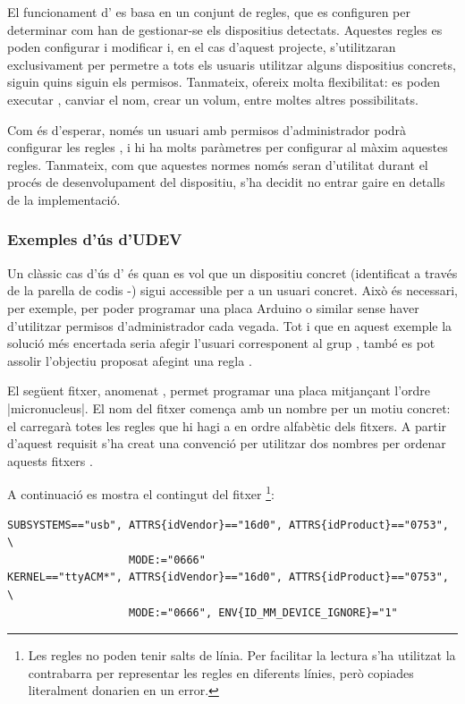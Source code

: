 El funcionament d' es basa en un conjunt de regles,
que es configuren per
determinar com han de gestionar-se els dispositius detectats.
Aquestes regles es poden configurar i modificar i, en el cas d'aquest projecte,
s'utilitzaran exclusivament per permetre a tots els usuaris utilitzar alguns
dispositius concrets, siguin quins siguin els permisos. Tanmateix, 
ofereix molta flexibilitat: es poden executar , canviar el nom,
crear un volum, entre moltes altres possibilitats.

Com és d'esperar, només un usuari amb permisos d'administrador podrà configurar
les regles , i hi ha molts paràmetres per configurar al màxim
aquestes regles. Tanmateix, com que aquestes normes només seran d'utilitat durant
el procés de desenvolupament del dispositiu, s'ha decidit no entrar gaire en
detalls de la implementació.

\subsubsection*{Exemples d'ús d'UDEV}

Un clàssic cas d'ús d' és quan es vol que un dispositiu 
concret (identificat a través de la parella de codis -)
sigui accessible per a un usuari concret. Això és necessari, per exemple, per
poder programar una placa Arduino o similar sense haver d'utilitzar permisos
d'administrador cada vegada.
Tot i que en aquest exemple la solució més encertada seria afegir l'usuari
corresponent al grup , també es pot assolir l'objectiu proposat
afegint una regla .

El següent fitxer, anomenat , permet programar una
placa  mitjançant l'ordre \ord|micronucleus|. El nom del fitxer
comença amb un nombre per un motiu concret: el  carregarà totes les
regles que hi hagi a  en ordre alfabètic dels fitxers.
A partir d'aquest requisit s'ha creat una convenció per utilitzar dos nombres
per ordenar aquests fitxers \cite{Udev}.

A continuació es mostra el contingut del fitxer
\footnote{
    Les regles  no poden tenir salts de línia. Per facilitar la
    lectura s'ha utilitzat la contrabarra per representar les regles en
    diferents línies, però copiades literalment donarien en un error.
}:

\begin{verbatim}
SUBSYSTEMS=="usb", ATTRS{idVendor}=="16d0", ATTRS{idProduct}=="0753", \
                   MODE:="0666"
KERNEL=="ttyACM*", ATTRS{idVendor}=="16d0", ATTRS{idProduct}=="0753", \
                   MODE:="0666", ENV{ID_MM_DEVICE_IGNORE}="1"
\end{verbatim}

